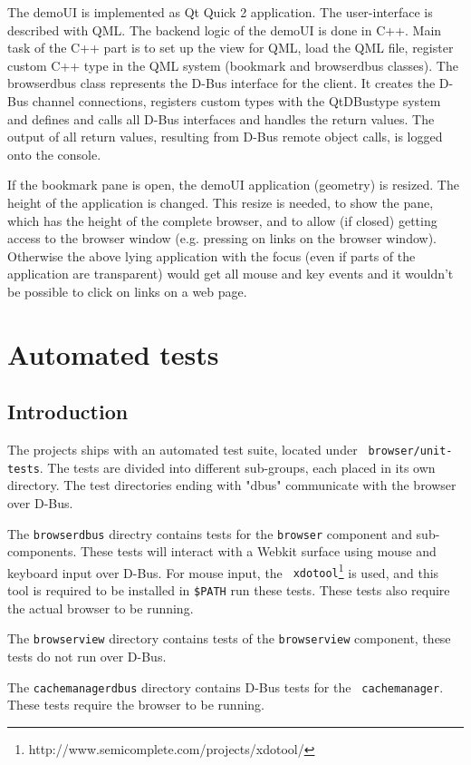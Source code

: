 \documentclass{pelagicore}
\begin{document}
The demoUI is implemented as Qt Quick 2 application. The user-interface is
described with QML. The backend logic of the demoUI is done in C++. Main task
of the C++ part is to set up the view for QML, load the QML file, register
custom C++ type in the QML system (bookmark and browserdbus classes). The
browserdbus class represents the D-Bus interface for the client. It creates the
D-Bus channel connections, registers custom types with the QtDBustype system
and defines and calls all D-Bus interfaces and handles the return values. The
output of all return values, resulting from D-Bus remote object calls, is logged
onto the console.

If the bookmark pane is open, the demoUI application (geometry) is resized. The
height of the application is changed. This resize is needed, to show the pane,
which has the height of the complete browser, and to allow (if closed) getting
access to the browser window (e.g. pressing on links on the browser window).
Otherwise the above lying application with the focus (even if parts of the
application are transparent) would get all mouse and key events and it wouldn’t
be possible to click on links on a web page.

\section{Automated tests}
\subsection{Introduction}
The projects ships with an automated test suite, located under {\tt
browser/unit-tests}. The tests are divided into different sub-groups, each
placed in its own directory. The test directories ending with "dbus"
communicate with the browser over D-Bus.

The {\tt browserdbus} directry contains tests for the {\tt browser} component
and sub-components. These tests will interact with a Webkit surface using mouse
and keyboard input over D-Bus. For mouse input, the {\tt
xdotool}\footnote{http://www.semicomplete.com/projects/xdotool/} is used, and
this tool is required to be installed in {\tt \$PATH} run these tests. These
tests also require the actual browser to be running.

The {\tt browserview} directory contains tests of the {\tt browserview}
component, these tests do not run over D-Bus.

The {\tt cachemanagerdbus} directory contains D-Bus tests for the {\tt
cachemanager}. These tests require the browser to be running.
\end{document}
